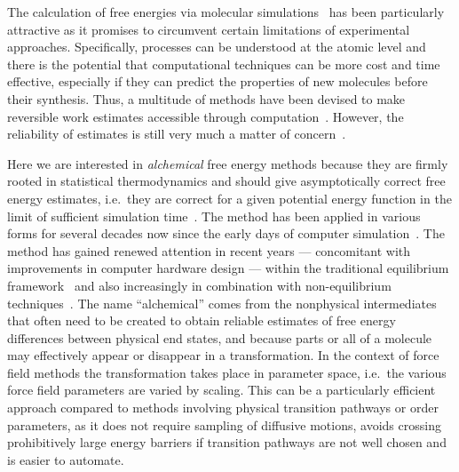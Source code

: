 \documentclass[journal=jctcce,manuscript=article]{achemso}
\begin{document}
The calculation of free energies via molecular 
simulations~\cite{hansen_practical_2014, doi:10.1021/jp102971x,
  Gallicchio201127, doi:10.1080/08927022.2015.1132317,
  doi:10.1146/annurev.matsci.32.111901.153708} has been particularly
attractive as it promises to circumvent certain limitations of experimental
approaches. Specifically, processes can be understood at the atomic level and there is the potential that computational techniques can be 
more cost and time effective, especially if they can predict the properties of new molecules before their synthesis.  
Thus, a multitude of methods have been devised
 to make reversible work estimates accessible through 
computation~\cite{hansen_practical_2014,
  doi:10.1021/jp102971x, Gallicchio201127,
  doi:10.1080/08927022.2015.1132317,
  doi:10.1146/annurev.matsci.32.111901.153708}.  However, the
reliability of estimates is still very much a matter of
concern~\cite{doi:10.1021/jp102971x, doi:10.1021/acs.jctc.5b00179}.

Here we are interested in \emph{alchemical} free energy methods because they 
are firmly rooted in statistical thermodynamics and should give asymptotically 
correct free energy estimates, i.e.\ they are correct for a given potential 
energy function in the limit of sufficient simulation 
time~\cite{Beveridge-citeulike:3789890, straatsma:92, doi:10.1021/cr00023a004, 
hansen_practical_2014}.  The method has been applied in various forms for 
several decades now since the early days of computer 
simulation~\cite{doi:10.1063/1.1671118, bennett_efficient_1976, 
doi:10.1063/1.432264, FS9821700055,  Tembe1984281, doi:10.1063/1.449208}.  The 
method has gained renewed attention in recent years --- concomitant with 
improvements in computer hardware design --- within the traditional equilibrium
framework~\cite{GILSON19971047, doi:10.1021/jp0217839, deng_computations_2009} 
and also increasingly in combination with non-equilibrium 
techniques~\cite{ytreberg_comparison_2006, JCC:JCC23804,
  doi:10.1021/ct500964e}.  The name ``alchemical'' comes from the nonphysical
intermediates that often need to be created to obtain reliable estimates of 
free energy differences between physical end states, and because parts or 
all of a molecule may effectively appear or disappear in a transformation.  In the 
context of force field methods the transformation takes place in parameter 
space, i.e.\ the various force field parameters are varied by scaling.  This 
can be a particularly efficient approach compared to methods involving physical transition pathways or order parameters, as it does not require sampling of 
diffusive motions, avoids crossing prohibitively large energy barriers if 
transition pathways are not well chosen and is easier to automate.
\end{document}
